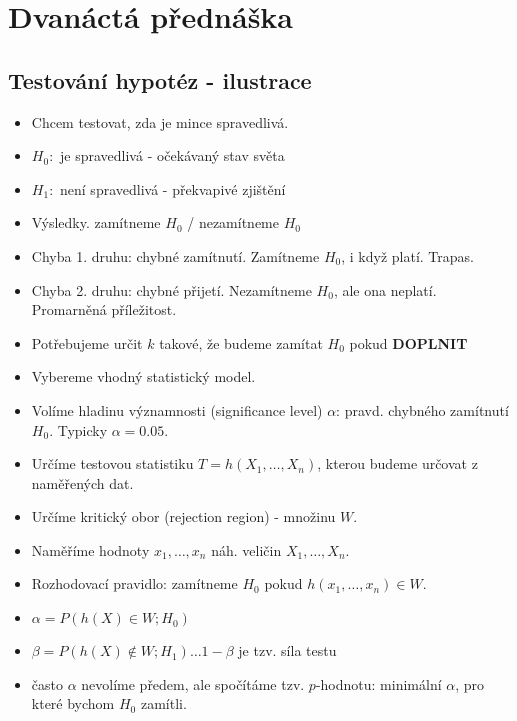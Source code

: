 \documentclass[../main.tex]{subfiles}
\begin{document}
\section{Dvanáctá přednáška}

\subsection{Testování hypotéz - ilustrace}
\begin{itemize}
    \item Chcem testovat, zda je mince spravedlivá.
    \item $H_0:$ je spravedlivá - očekávaný stav světa
    \item $H_1:$ není spravedlivá - překvapivé zjištění
    \item Výsledky. zamítneme $H_0$ / nezamítneme $H_0$
    \item Chyba 1. druhu: chybné zamítnutí. Zamítneme $H_0$, i když platí. Trapas.
    \item Chyba 2. druhu: chybné přijetí. Nezamítneme $H_0$, ale ona neplatí. Promarněná příležitost.
    \item Potřebujeme určit $k$ takové, že budeme zamítat $H_0$ pokud \textbf{DOPLNIT}
\end{itemize}
\begin{itemize}
    \item Vybereme vhodný statistický model.
    \item Volíme hladinu významnosti (significance level) $\alpha$: pravd. chybného zamítnutí $H_0$. Typicky $\alpha = 0.05$.
    \item Určíme testovou statistiku $T = h(X_1,\dots,X_n)$, kterou budeme určovat z naměřených dat.
    \item Určíme kritický obor (rejection region) - množinu $W$.
    \item Naměříme hodnoty $x_1,\dots,x_n$ náh. veličin $X_1,\dots,X_n$.
    \item Rozhodovací pravidlo: zamítneme $H_0$ pokud $h(x_1,\dots,x_n) \in W$.
    \item $\alpha = P(h(X) \in W; H_0)$
    \item $\beta = P(h(X) \notin W; H_1) \dots 1 - \beta$ je tzv. síla testu
    \item často $\alpha$ nevolíme předem, ale spočítáme tzv. $p$-hodnotu: minimální $\alpha$, pro které bychom $H_0$ zamítli.
\end{itemize}
\end{document}

